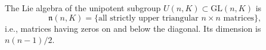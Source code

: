 The Lie algebra of the unipotent subgroup $U(n, K) \subset \mathrm{GL}(n, K)$ is
$$\mathfrak{n}(n, K) = \{\text{all strictly upper triangular } n \times n \text{ matrices}\},$$
i.e., matrices having zeros on and below the diagonal. Its dimension is $n(n-1)/2$.
